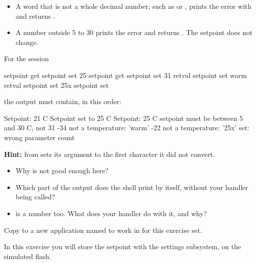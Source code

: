 \begin{itemize}
  \item A word that is not a whole decimal number, such as  or , prints the error
     with  and returns .
  \item A number outside 5 to 30 prints the error  and
    returns . The setpoint does not change.
\end{itemize}

For the session

\begin{console}
setpoint get
setpoint set 25
setpoint get
setpoint set 31
retval
setpoint set warm
retval
setpoint set 25x
setpoint set
\end{console}

the output must contain, in this order:

\begin{console}
Setpoint: 21 C
Setpoint set to 25 C
Setpoint: 25 C
setpoint must be between 5 and 30 C, not 31
-34
not a temperature: 'warm'
-22
not a temperature: '25x'
set: wrong parameter count
\end{console}

\noindent \textbf{Hint:}  from  sets its  argument to the
first character it did not convert.

\begin{itemize}
  \item Why is  not good enough here?
  \item Which part of the output does the shell print by itself, without your handler being called?
  \item {} is a number too. What does your handler do with it, and
    why?
\end{itemize}

\label{c6:set:2}
Copy  to a new application named  to work in for this exercise set.

\label{c6:ex:2.1}
In this exercise you will store the setpoint with the settings subsystem, on the simulated flash.

